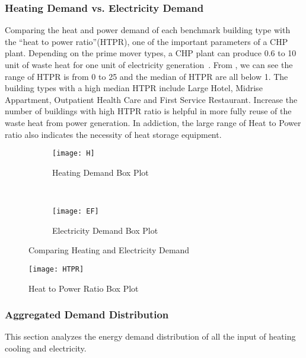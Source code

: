 \subsubsection{Heating Demand vs. Electricity Demand}
Comparing the heat and power demand of each benchmark building type
with the ``heat to power ratio''(HTPR), one of the important
parameters of a CHP plant. Depending on the prime mover types, a CHP
plant can produce 0.6 to 10 unit of waste heat for one unit of
electricity generation~\cite{introCHP2010}. From , we
can see the range of HTPR is from 0 to 25 and the median of HTPR are
all below 1. The building types with a high median HTPR include Large
Hotel, Midrise Appartment, Outpatient Health Care and First Service
Restaurant. Increase the number of buildings with high HTPR ratio is
helpful in more fully reuse of the waste heat from power
generation. In addiction, the large range of Heat to Power ratio also
indicates the necessity of heat storage equipment.
\begin{figure}[h!]
  \centering
  \begin{subfigure}{0.4\textwidth}
  \centering
  \texttt{[image: H]}
  \caption[Heating Demand Box Plot]{Heating Demand Box
    Plot}
  \label{fig:H}
\end{subfigure}
~
\begin{subfigure}{0.4\textwidth}
  \centering
  \texttt{[image: EF]}
  \caption[Electricity Demand Box Plot]{Electricity Demand Box Plot}
  \label{fig:EF2}
\end{subfigure}
\caption[Comparing Heating and Electricity Demand]{Comparing Heating
  and Electricity Demand}
\end{figure}

\begin{figure}[h!]
  \centering
  \texttt{[image: HTPR]}
  \caption[Heat to Power Ratio Box Plot]{Heat to Power Ratio Box Plot}
  \label{fig:HTPR}
\end{figure}%

\subsubsection{Aggregated Demand Distribution}
This section analyzes the energy demand distribution of all the input
of heating cooling and electricity.  

